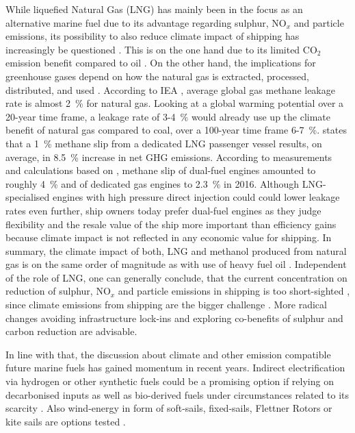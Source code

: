\documentclass[article]{elsarticle}
\begin{document}
While liquefied Natural Gas (LNG) has mainly been in the focus as an alternative marine fuel \cite{IMO2016a,DNVGL2015} due to its advantage regarding sulphur, NO$_x$ and particle emissions, its possibility to also reduce climate impact of shipping has increasingly be questioned \cite{Brynolf2014b}. This is on the one hand due to its limited CO$_2$ emission benefit compared to oil \cite{DNVGL2014}. On the other hand, the implications for greenhouse gases depend on how the natural gas is extracted, processed, distributed, and used \cite{THOMSON2015}. According to IEA \cite{IEA2017}, average global gas methane leakage rate is almost 2~\% for natural gas. Looking at a global warming potential over a 20-year time frame, a leakage rate of 3-4~\% would already use up the climate benefit of natural gas compared to coal, over a 100-year time frame 6-7~\%. \citep{Hagos2018} states that a 1~\% methane slip from a dedicated LNG passenger vessel results, on average, in 8.5~\% increase in net GHG emissions. According to measurements and calculations based on \cite{Corbett2015,Stenersen2017}, methane slip of dual-fuel engines amounted to roughly 4~\% and of dedicated gas engines to 2.3~\% in 2016. Although LNG-specialised engines with high pressure direct injection could could lower leakage rates even further, ship owners today prefer dual-fuel engines as they judge flexibility and the resale value of the ship more important than efficiency gains because climate impact is not reflected in any economic value for shipping. 
In summary, the climate impact of both, LNG and methanol produced from natural gas is on the same order of magnitude as with use of heavy fuel oil \cite{BRYNOLF2014,DNVGL2018}. 
Independent of the role of LNG, one can generally conclude, that the current concentration on reduction of sulphur, NO$_x$ and particle emissions in shipping is too short-sighted \cite{Gilbert2014}, since climate emissions from shipping are the bigger challenge \cite{FRIDELL2019}. More radical changes avoiding infrastructure lock-ins and exploring co-benefits of sulphur and carbon reduction are advisable.

In line with that, the discussion about climate and other emission compatible future marine fuels has gained momentum in recent years. Indirect electrification via hydrogen or other synthetic fuels could be a promising option \cite{HORVATH2018} if relying on decarbonised inputs as well as bio-derived fuels under circumstances related to its scarcity \cite{Gilbert2014}. Also wind-energy in form of soft-sails, fixed-sails, Flettner Rotors or kite sails are options tested \cite{IRENA2015}.
\end{document}
